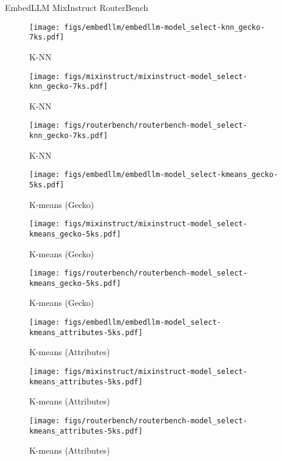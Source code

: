 \newcommand{\imgw}{0.9\textwidth}
\begin{figure*}[th]
  \begin{minipage}[b]{.98\linewidth}
  
\begin{center}
 EmbedLLM \hspace{30mm} MixInstruct \hspace{28mm} RouterBench
 \end{center}
 \vspace{2mm}
 
    \begin{subfigure}{0.32\textwidth}
        \texttt{[image: figs/embedllm/embedllm-model\_select-knn\_gecko-7ks.pdf]}
        \caption{K-NN}
    \end{subfigure}
    \begin{subfigure}{0.32\textwidth}
        \texttt{[image: figs/mixinstruct/mixinstruct-model\_select-knn\_gecko-7ks.pdf]}
        \caption{K-NN}
    \end{subfigure}
    \begin{subfigure}{0.32\textwidth}
        \texttt{[image: figs/routerbench/routerbench-model\_select-knn\_gecko-7ks.pdf]}
        \caption{K-NN}
    \end{subfigure}
    
    \begin{subfigure}{0.32\textwidth}
        \texttt{[image: figs/embedllm/embedllm-model\_select-kmeans\_gecko-5ks.pdf]}
        \caption{K-means (Gecko)}
    \end{subfigure}
    \begin{subfigure}{0.32\textwidth}
        \texttt{[image: figs/mixinstruct/mixinstruct-model\_select-kmeans\_gecko-5ks.pdf]}
        \caption{K-means (Gecko)}
    \end{subfigure}
    \begin{subfigure}{0.32\textwidth}
        \texttt{[image: figs/routerbench/routerbench-model\_select-kmeans\_gecko-5ks.pdf]}
        \caption{K-means (Gecko)}
    \end{subfigure}
    
   \begin{subfigure}{0.32\textwidth}
        \texttt{[image: figs/embedllm/embedllm-model\_select-kmeans\_attributes-5ks.pdf]}
        \caption{K-means (Attributes)}
    \end{subfigure}
    \begin{subfigure}{0.32\textwidth}
        \texttt{[image: figs/mixinstruct/mixinstruct-model\_select-kmeans\_attributes-5ks.pdf]}
        \caption{K-means (Attributes)}
    \end{subfigure}
    \begin{subfigure}{0.32\textwidth}
        \texttt{[image: figs/routerbench/routerbench-model\_select-kmeans\_attributes-5ks.pdf]}
        \caption{K-means (Attributes)}
    \end{subfigure}
    

\end{minipage}
\end{figure*}
